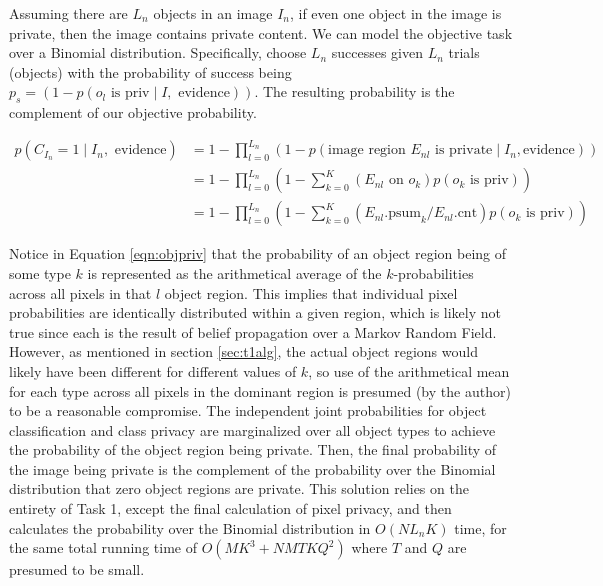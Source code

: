 \documentclass[11pt]{article}
\begin{document}
Assuming there are $L_n$ objects in an image $I_n$, if even one object in the image is private, then the image contains private content.  We can model the objective task over a Binomial distribution.  Specifically, choose $L_n$ successes given $L_n$ trials (objects) with the probability of success being $p_s = (1-p(o_l \textrm{ is priv} \mid I, \textrm{ evidence}))$.  The resulting probability is the complement of our objective probability.

\begin{align}\label{eqn:task2.0}
    p(C_{I_{n}} = 1 \mid I_n, \textrm{ evidence}) & = 1 - \prod_{l = 0}^{L_n} \left( 1 - p(\textrm{image region $E_{nl}$ 
        is private} \mid I_n, \textrm{evidence}) \right)\\
    & = 1 - \prod_{l = 0}^{L_n} \left( 1 - \sum_{k=0}^{K} (E_{nl}\textrm{ on } o_k) p(o_k \textrm{ is priv}) \right)\\
    & = 1 - \prod_{l = 0}^{L_n} \left( 1 - \sum_{k=0}^{K} (E_{nl}\textrm{.psum}_k / E_{nl}\textrm{.cnt}) p(o_k \textrm{ is priv}) \right) \label{eqn:objpriv}
\end{align}

Notice in Equation \ref{eqn:objpriv} that the probability of an object region being of some type $k$ is represented as the arithmetical average of the $k$-probabilities across all pixels in that $l$ object region.  This implies that individual pixel probabilities are identically distributed within a given region, which is likely not true since each is the result of belief propagation over a Markov Random Field.  However, as mentioned in section \ref{sec:t1alg}, the actual object regions would likely have been different for different values of $k$, so use of the arithmetical mean for each type across all pixels in the dominant region is presumed (by the author) to be a reasonable compromise.  The independent joint probabilities for object classification and class privacy are marginalized over all object types to achieve the probability of the object region being private.  Then, the final probability of the image being private is the complement of the probability over the Binomial distribution that zero object regions are private.  This solution relies on the entirety of Task 1, except the final calculation of pixel privacy, and then calculates the probability over the Binomial distribution in $O(N L_n K)$ time, for the same total running time of $O(MK^3 + NMTKQ^2)$ where $T$ and $Q$ are presumed to be small.
\end{document}
